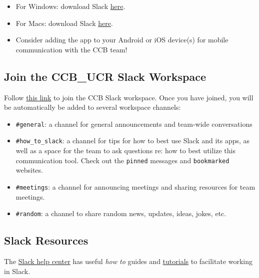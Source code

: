\documentclass[
]{book}
\providecommand{\tightlist}{%
  \setlength{\itemsep}{0pt}\setlength{\parskip}{0pt}}
\begin{document}
\begin{itemize}
\tightlist
\item
  For Windows: download Slack \href{https://slack.com/downloads/windows}{here}.
\item
  For Macs: download Slack \href{https://slack.com/downloads/mac}{here}.
\item
  Consider adding the app to your Android or iOS device(s) for mobile communication with the CCB team!
\end{itemize}

\hypertarget{join-the-ccb_ucr-slack-workspace}{%
\subsection{Join the CCB\_UCR Slack Workspace}\label{join-the-ccb_ucr-slack-workspace}}

Follow \href{https://join.slack.com/t/ccbucr/shared_invite/zt-1dfpaguqs-F4CAPCI4ILMvT0JOcSpnag}{this link} to join the CCB Slack workspace. Once you have joined, you will be automatically be added to several workspace channels:

\begin{itemize}
\tightlist
\item
  \texttt{\#general}: a channel for general announcements and team-wide conversations
\item
  \texttt{\#how\_to\_slack}: a channel for tips for how to best use Slack and its apps, as well as a space for the team to ask questions re: how to best utilize this communication tool. Check out the \texttt{pinned} messages and \texttt{bookmarked} websites.
\item
  \texttt{\#meetings}: a channel for announcing meetings and sharing resources for team meetings.
\item
  \texttt{\#random}: a channel to share random news, updates, ideas, jokes, etc.
\end{itemize}

\hypertarget{slack-resources}{%
\subsection{Slack Resources}\label{slack-resources}}

The \href{https://slack.com/help/articles/360059928654-How-to-use-Slack--your-quick-start-guide}{Slack help center} has useful \emph{how to} guides and \href{https://slack.com/help/articles/360059976673-Slack-video-tutorials}{tutorials} to facilitate working in Slack.
\end{document}
